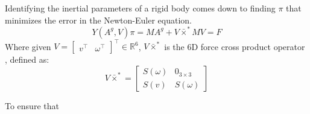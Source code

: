 Identifying the inertial parameters of a rigid body comes down to finding $\pi$ that minimizes the error in the Newton-Euler equation.
\begin{equation}
  Y(A^g,V)\pi = M A^g + V\bar{\times}^*MV = F
\end{equation}
Where given $V = \begin{bmatrix} v^\top & \omega^\top \end{bmatrix}^\top \in \mathbb{R}^6$,  $V \bar \times^*$ is the 6D force cross product operator \cite{featherstone:book:2007}, defined as:
$$
V \bar \times^*
=
\begin{bmatrix}
S(\omega) & 0_{3\times3} \\
S(v)      & S(\omega)
\end{bmatrix}
$$

To ensure that
